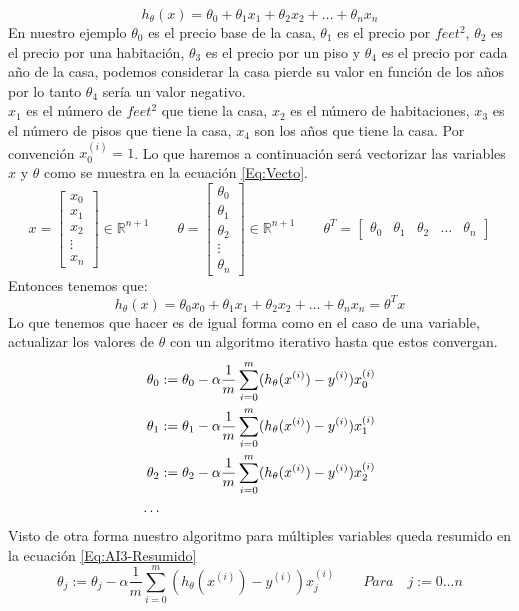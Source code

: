 \documentclass{report}
\begin{document}
\begin{equation}
	h_\theta(x)=\theta_0+\theta_1x_1+\theta_2x_2+\dots+\theta_nx_n
	\label{Eq:Hip2}
\end{equation}
En nuestro ejemplo $\theta_0$ es el precio base de la casa, $\theta_1$ es el precio por $feet^2$, $\theta_2$ es el precio por una habitación, $\theta_3$ es el precio por un piso y $\theta_4$ es el precio por cada año de la casa, podemos considerar la casa pierde su valor en función de los años por lo tanto $\theta_4$ sería un valor negativo.\\
$x_1$ es el número de $feet^2$ que tiene la casa, $x_2$ es el número de habitaciones, $x_3$ es el número de pisos que tiene la casa, $x_4$ son los años que tiene la casa. Por convención $x_0^{(i)}=1$. Lo que haremos a continuación será vectorizar las variables $x$ y $\theta$ como se muestra en la ecuación \ref{Eq:Vecto}.
\begin{equation}
x=\left[
\begin{array}{c}
	x_0\\x_1\\x_2\\\vdots\\x_n
\end{array}
\right]\in \mathbb{R}^{n+1}\qquad
\theta=\left[
\begin{array}{c}
\theta_0\\\theta_1\\\theta_2\\\vdots\\\theta_n
\end{array}
\right]\in \mathbb{R}^{n+1}\qquad
\theta^T=\left[
\begin{array}{ccccc}
\theta_0&\theta_1&\theta_2&\dots&\theta_n
\end{array}
\right]
\label{Eq:Vecto}
\end{equation}
Entonces tenemos que:
\begin{equation}
h_\theta(x)=\theta_0x_0+\theta_1x_1+\theta_2x_2+\dots+\theta_nx_n=\theta^Tx
\label{Eq:HipVecto}
\end{equation}
Lo que tenemos que hacer es de igual forma como en el caso de una variable, actualizar los valores de $\theta$ con un algoritmo iterativo hasta que estos convergan.
\begin{align}
\theta_0&:=\theta_0-\alpha\frac{1}{m}\sum_{i=0}^{m}(h_\theta(x^{(i)})-y^{(i)})x_0^{(i)}\label{Eq:AI3-1}\\
\theta_1&:=\theta_1-\alpha\frac{1}{m}\sum_{i=0}^{m}(h_\theta(x^{(i)})-y^{(i)})x_1^{(i)}\label{Eq:AI3-2}\\
\theta_2&:=\theta_2-\alpha\frac{1}{m}\sum_{i=0}^{m}(h_\theta(x^{(i)})-y^{(i)})x_2^{(i)}\label{Eq:AI3-3}\\
\dots\notag
\end{align}
Visto de otra forma nuestro algoritmo para múltiples variables queda resumido en la ecuación \ref{Eq:AI3-Resumido}
\begin{equation}
\theta_j:=\theta_j-\alpha\frac{1}{m}\sum_{i=0}^{m}(h_\theta(x^{(i)})-y^{(i)})x_j^{(i)} \qquad Para\quad j:=0\dots n
\label{Eq:AI3-Resumido}
\end{equation}
\end{document}
